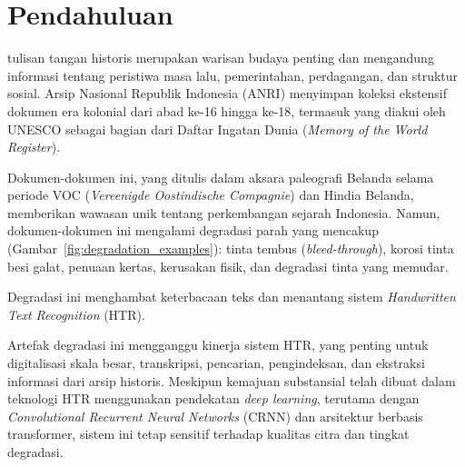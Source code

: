 \documentclass[journal]{IEEEtran}
\begin{document}
% 
\IEEEpeerreviewmaketitle

\section{Pendahuluan}
 tulisan tangan historis merupakan warisan budaya penting dan mengandung informasi tentang peristiwa masa lalu, pemerintahan, perdagangan, dan struktur sosial. Arsip Nasional Republik Indonesia (ANRI) menyimpan koleksi ekstensif dokumen era kolonial dari abad ke-16 hingga ke-18, termasuk yang diakui oleh UNESCO sebagai bagian dari Daftar Ingatan Dunia (\textit{Memory of the World Register}).

Dokumen-dokumen ini, yang ditulis dalam aksara paleografi Belanda selama periode VOC (\textit{Vereenigde Oostindische Compagnie}) dan Hindia Belanda, memberikan wawasan unik tentang perkembangan sejarah Indonesia. Namun, dokumen-dokumen ini mengalami degradasi parah yang mencakup (Gambar~\ref{fig:degradation_examples}): tinta tembus (\textit{bleed-through}), korosi tinta besi galat, penuaan kertas, kerusakan fisik, dan degradasi tinta yang memudar.

Degradasi ini menghambat keterbacaan teks dan menantang sistem \textit{Handwritten Text Recognition} (HTR).

Artefak degradasi ini mengganggu kinerja sistem HTR, yang penting untuk digitalisasi skala besar, transkripsi, pencarian, pengindeksan, dan ekstraksi informasi dari arsip historis. Meskipun kemajuan substansial telah dibuat dalam teknologi HTR menggunakan pendekatan \textit{deep learning}, terutama dengan \textit{Convolutional Recurrent Neural Networks} (CRNN) dan arsitektur berbasis transformer, sistem ini tetap sensitif terhadap kualitas citra dan tingkat degradasi.

\end{document}
